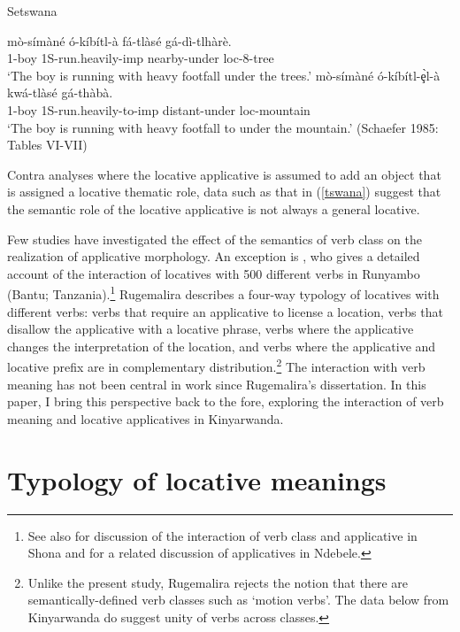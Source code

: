 \documentclass[output=paper]{langsci/langscibook}
\begin{document}
\begin{exe}
	\ex\label{tswana}Setswana\begin{xlist}
		\ex  \gll m\`o-s\'im\`an\'e \'o-k\'ib\'itl-\`a f\'a-tl\`as\'e g\'a-d\`i-tlh\`ar\`e.\\
			1-boy 1S-run.heavily-{\sc imp} {\sc nearby-}under {\sc loc-8-}tree\\
			\glt `The boy is running with heavy footfall under the trees.'
		\ex\gll m\`o-s\'im\`an\'e \'o-k\'ib\'itl-\c{\`e}l-\`a kw\'a-tl\`as\'e g\'a-th\`ab\`a.\\
			1-boy 1S-run.heavily-to-{\sc imp} {\sc distant}-under {\sc loc-}mountain\\
			\glt `The boy is running with heavy footfall to under the mountain.'  (Schaefer 1985: Tables VI-VII)
	\end{xlist}
\end{exe}
%
Contra analyses where the locative applicative is assumed to add an object that is assigned a {\sc locative} thematic role, data such as that in (\ref{tswana}) suggest that the semantic role of the locative applicative is not always a general {\sc locative}.

Few studies have investigated the effect of the semantics of verb class on the realization of applicative morphology. An exception is \citet{rugemalira:1993}, who gives a detailed account of the interaction of locatives with 500 different verbs in Runyambo (Bantu; Tanzania).\footnote{See also \citet{cannmabugu:2006} for discussion of the interaction of verb class and applicative in Shona and \citet{sibanda:2016} for a related discussion of applicatives in Ndebele.} Rugemalira describes a four-way typology of locatives with different verbs: verbs that require an applicative to license a location, verbs that disallow the applicative with a locative phrase, verbs where the applicative changes the interpretation of the location, and verbs where the applicative and locative prefix are in complementary distribution.\footnote{Unlike the present study, Rugemalira rejects the notion that there are semantically-defined verb classes such as `motion verbs'. The data below from Kinyarwanda do suggest unity of verbs across classes.}
The interaction with verb meaning has not been central in work since Rugemalira's dissertation. In this paper, I bring this perspective back to the fore, exploring the interaction of verb meaning and locative applicatives in Kinyarwanda.

\section{Typology of locative meanings}%
\end{document}
